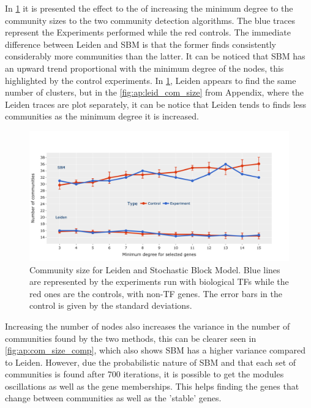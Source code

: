In \cref{fig:N_I:comp_size_com_det} it is presented the effect to the of increasing the minimum degree to the community sizes to the two community detection algorithms. The blue traces represent the Experiments performed while the red controls. The immediate difference between Leiden and SBM is that the former finds consistently considerably more communities than the latter. It can be noticed that SBM has an upward trend proportional with the minimum degree of the nodes, this highlighted by the control experiments. In \cref{fig:N_I:comp_size_com_det}, Leiden appears to find the same number of clusters, but in the \cref{fig:ap:leid_com_size} from Appendix, where the Leiden traces are plot separately, it can be notice that Leiden tends to finds less communities as the minimum degree it is increased. 

\begin{figure}[!htb]   
\centering
\includegraphics[width=1.0\textwidth,height=1.0\textheight,keepaspectratio]{Sections/Network_I/Resources/selective_pruning/sbm_Leiden_combNum.png}
  \caption{Community size for Leiden and Stochastic Block Model. Blue lines are represented by the experiments run with biological TFs while the red ones are the controls, with non-TF genes. The error bars in the control is given by the standard deviations.}
\label{fig:N_I:comp_size_com_det}
\end{figure}

Increasing the number of nodes also increases the variance in the number of communities found by the two methods, this can be clearer seen in \cref{fig:ap:com_size_comp}, which also shows SBM has a higher variance compared to Leiden. However, due the probabilistic nature of SBM and that each set of communities is found after 700 iterations, it is possible to get the modules oscillations as well as the gene memberships. This helps finding the genes that change between communities as well as the 'stable' genes.

